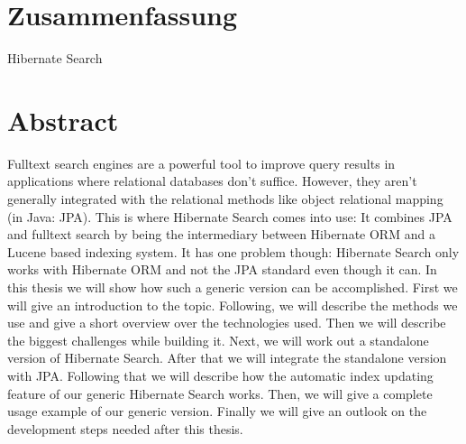 \section*{Zusammenfassung}
Hibernate Search


%


\section*{Abstract}

Fulltext search engines are a powerful tool to improve query results in applications where relational databases don't suffice. However, they aren't generally integrated with the relational methods like object relational mapping (in Java: JPA). This is where Hibernate Search comes into use: It combines JPA and fulltext search by being the intermediary between Hibernate ORM and a Lucene based indexing system. It has one problem though: Hibernate Search only works with Hibernate ORM and not the JPA standard even though it can. In this thesis we will show how such a generic version can be accomplished. First  we will give an introduction to the topic. Following, we will describe the methods we use and give a short overview over the technologies used. Then we will describe the biggest challenges while building it. Next, we will work out a standalone version of Hibernate Search. After that we will integrate the standalone version with JPA. Following that we will describe how the automatic index updating feature of our generic Hibernate Search works. Then, we will give a complete usage example of our generic version. Finally we will give an outlook on the development steps needed after this thesis.

